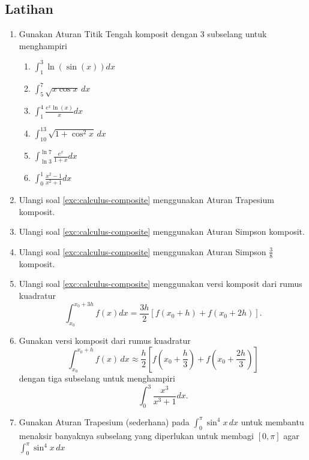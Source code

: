 \subsection{Latihan}
\begin{enumerate}
\item \label{exc:calculus-composite}Gunakan Aturan Titik Tengah komposit
dengan 3 subselang untuk menghampiri

\begin{enumerate}
\item ${\displaystyle \int_{1}^{3}\ln(\sin(x))dx}$ \hasasolution 
\item ${\displaystyle \int_{5}^{7}\sqrt{x\cos x}\,dx}$
\item ${\displaystyle \int_{1}^{4}\frac{e^{x}\ln(x)}{x}dx}$ \hasananswer 
\item ${\displaystyle \int_{10}^{13}\sqrt{1+\cos^{2}x}\,dx}$
\item ${\displaystyle \int_{\ln3}^{\ln7}\frac{e^{x}}{1+x}dx}$ \hasananswer 
\item ${\displaystyle \int_{0}^{1}\frac{x^{2}-1}{x^{2}+1}dx}$
\end{enumerate}
\item \label{exc:calculus-composite-7}Ulangi soal \ref{exc:calculus-composite}
menggunakan Aturan Trapesium komposit. \haspartwithsolution  \haspartwithanswer 
\item \label{exc:calculus-composite-8}Ulangi soal \ref{exc:calculus-composite}
menggunakan Aturan Simpson komposit. \haspartwithsolution  \haspartwithanswer 
\item \label{exc:calculus-composite-9}Ulangi soal \ref{exc:calculus-composite}
menggunakan Aturan Simpson $\frac{3}{8}$ komposit. \haspartwithsolution  \haspartwithanswer 
\item \label{exc:calculus-composite-10}Ulangi soal \ref{exc:calculus-composite}
menggunakan versi komposit dari rumus kuadratur \haspartwithsolution  \haspartwithanswer 
\[
\int_{x_{0}}^{x_{0}+3h}f(x)dx=\frac{3h}{2}\left[f(x_{0}+h)+f(x_{0}+2h)\right].
\]
\item Gunakan versi komposit dari rumus kuadratur
\[
\int_{x_{0}}^{x_{0}+h}f(x)\,dx\approx\frac{h}{2}\left[f\left(x_{0}+\frac{h}{3}\right)+f\left(x_{0}+\frac{2h}{3}\right)\right]
\]
dengan tiga subselang untuk menghampiri
\[
\int_{0}^{3}\frac{x^{3}}{x^{3}+1}dx.
\]
\item \label{exc:calculus-composite-11}Gunakan Aturan Trapesium (sederhana)
pada $\int_{0}^{\pi}\sin^{4}x\,dx$ untuk membantu menaksir banyaknya
subselang yang diperlukan untuk membagi $[0,\pi]$ agar $\int_{0}^{\pi}\sin^{4}x\,dx$

\end{enumerate}

